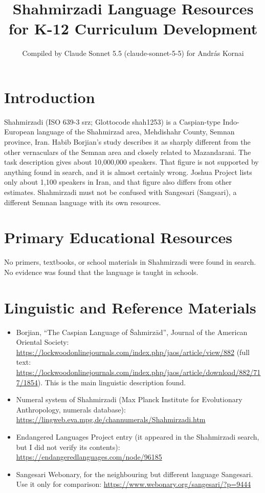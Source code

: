 \documentclass[12pt]{article}
\title{Shahmirzadi Language Resources for K-12 Curriculum Development}
\author{Compiled by Claude Sonnet 5.5 (claude-sonnet-5-5) for Andr\'as Kornai}
\date{}
\begin{document}
\maketitle

\section{Introduction}
Shahmirzadi (ISO 639-3 srz; Glottocode shah1253) is a Caspian-type Indo-European language of the Shahmirzad area, Mehdishahr County, Semnan province, Iran. Habib Borjian's study describes it as sharply different from the other vernaculars of the Semnan area and closely related to Mazandarani. The task description gives about 10,000,000 speakers. That figure is not supported by anything found in search, and it is almost certainly wrong. Joshua Project lists only about 1,100 speakers in Iran, and that figure also differs from other estimates. Shahmirzadi must not be confused with Sangesari (Sangsari), a different Semnan language with its own resources.

\section{Primary Educational Resources}
No primers, textbooks, or school materials in Shahmirzadi were found in search. No evidence was found that the language is taught in schools.

\section{Linguistic and Reference Materials}
\begin{itemize}
\item Borjian, ``The Caspian Language of {\v S}ahmirz\=ad'', Journal of the American Oriental Society: \url{https://lockwoodonlinejournals.com/index.php/jaos/article/view/882} (full text: \url{https://lockwoodonlinejournals.com/index.php/jaos/article/download/882/717/1854}). This is the main linguistic description found.
\item Numeral system of Shahmirzadi (Max Planck Institute for Evolutionary Anthropology, numerals database): \url{https://lingweb.eva.mpg.de/channumerals/Shahmirzadi.htm}
\item Endangered Languages Project entry (it appeared in the Shahmirzadi search, but I did not verify its contents): \url{https://endangeredlanguages.com/node/96185}
\item Sangesari Webonary, for the neighbouring but different language Sangesari. Use it only for comparison: \url{https://www.webonary.org/sangesari/?p=9444}
\end{itemize}
\end{document}
